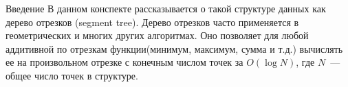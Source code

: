 \begin{part}[Введение]{Введение}
В данном конспекте рассказывается о такой структуре данных как дерево отрезков (segment tree).
Дерево отрезков часто применяется в геометрических и многих других алгоритмах. Оно позволяет
для любой аддитивной по отрезкам функции(минимум, максимум, сумма и т.д.) вычислять ее на 
произвольном отрезке с конечным числом точек за $O(\log N)$, где $N$~--- общее число точек в структуре.

\end{part}